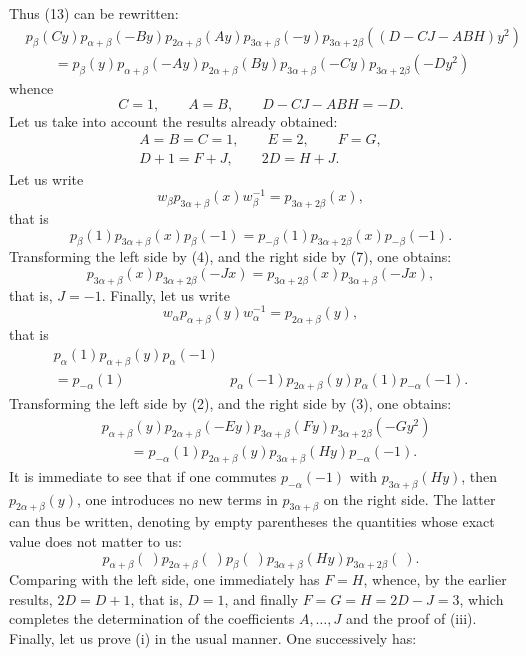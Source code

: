 Thus (13) can be rewritten:
\[
\begin{aligned}
&p_\beta(Cy)p_{\alpha+\beta}(-By)p_{2\alpha+\beta}(Ay)p_{3\alpha+\beta}(-y)p_{3\alpha+2\beta}((D-CJ-ABH)y^2)\\
&\qquad=p_\beta(y)p_{\alpha+\beta}(-Ay)p_{2\alpha+\beta}(By)p_{3\alpha+\beta}(-Cy)p_{3\alpha+2\beta}(-Dy^2)
\end{aligned}
\]
whence
\[
C=1,\qquad A=B,\qquad D-CJ-ABH=-D.
\]
Let us take into account the results already obtained:
\[
\begin{gathered}
A=B=C=1,\qquad E=2,\qquad F=G,\\
D+1=F+J,\qquad 2D=H+J.
\end{gathered}
\]
Let us write
\[
w_\beta p_{3\alpha+\beta}(x)w_\beta^{-1}=p_{3\alpha+2\beta}(x),
\]
that is
\[
p_\beta(1)p_{3\alpha+\beta}(x)p_\beta(-1)=p_{-\beta}(1)p_{3\alpha+2\beta}(x)p_{-\beta}(-1).
\]
Transforming the left side by (4), and the right side by (7), one obtains:
\[
p_{3\alpha+\beta}(x)p_{3\alpha+2\beta}(-Jx)=p_{3\alpha+2\beta}(x)p_{3\alpha+\beta}(-Jx),
\]
that is, $J=-1$.
Finally, let us write
\[
w_\alpha p_{\alpha+\beta}(y)w_\alpha^{-1}=p_{2\alpha+\beta}(y),
\]
that is
\[
\begin{split}
p_\alpha(1)p_{\alpha+\beta}(y)p_\alpha(-1)&\\
{}=p_{-\alpha}(1)&p_\alpha(-1)p_{2\alpha+\beta}(y)p_\alpha(1)p_{-\alpha}(-1).
\end{split}
\]
Transforming the left side by (2), and the right side by (3), one obtains:
\[
\begin{aligned}
&p_{\alpha+\beta}(y)p_{2\alpha+\beta}(-Ey)p_{3\alpha+\beta}(Fy)p_{3\alpha+2\beta}(-Gy^2)\\
&\qquad=p_{-\alpha}(1)p_{2\alpha+\beta}(y)p_{3\alpha+\beta}(Hy)p_{-\alpha}(-1).
\end{aligned}
\]
It is immediate to see that if one commutes $p_{-\alpha}(-1)$ with $p_{3\alpha+\beta}(Hy)$, then $p_{2\alpha+\beta}(y)$, one introduces no new terms in $p_{3\alpha+\beta}$ on the right side. The latter can thus be written, denoting by empty parentheses the quantities whose exact value does not matter to us:
\[
p_{\alpha+\beta}(\ )p_{2\alpha+\beta}(\ )p_\beta(\ )p_{3\alpha+\beta}(Hy)p_{3\alpha+2\beta}(\ ).
\]
Comparing with the left side, one immediately has $F=H$, whence, by the earlier results, $2D=D+1$, that is, $D=1$, and finally $F=G=H=2D-J=3$, which completes the determination of the coefficients $A,\ldots,J$ and the proof of (iii).
Finally, let us prove (i) in the usual manner. One successively has:
